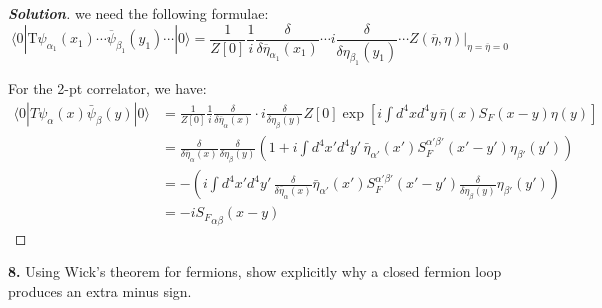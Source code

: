 \documentclass[11pt]{article}
\newenvironment{solution}[1][]{\begin{proof}[\textbf{Solution}]}{\end{proof}}
\begin{document}
\begin{solution}[12.7]
we need the following formulae:
\[
\langle0|\mathrm{T}\psi_{\alpha_1}(x_1)\cdots\overline{\psi}_{\beta_1}(y_1)\cdots|0\rangle=\frac{1}{Z[0]}\frac{1}{i}\left.\frac{\delta}{\delta\overline{\eta}_{\alpha_1}(x_1)}\right.\cdots i\left.\frac{\delta}{\delta\eta_{\beta_1}(y_1)}\right.\cdots\left.Z(\overline{\eta},\eta)\right|_{\eta=\overline{\eta}=0}
\]

For the 2-pt correlator, we have:
\[
\begin{aligned}
\langle0|T\psi_\alpha(x)\bar{\psi}_\beta(y)|0\rangle&=\frac{1}{Z[0]}\frac 1i\frac{\delta}{\delta\overline{\eta}_{\alpha}(x)}\cdot i\frac{\delta}{\delta{\eta}_{\beta}(y)} Z[0] \exp\left[i\int d^4xd^4y\,\overline{\eta}(x)S_F(x-y)\eta(y)\right]\\
&=\frac{\delta}{\delta\overline{\eta}_{\alpha}(x)}\frac{\delta}{\delta{\eta}_{\beta}(y)} \left(1+i\int d^4x'd^4y'\,\bar{\eta}_{\alpha'}(x') S_F^{\alpha'\beta'}(x'-y')\eta_{\beta'}(y')\right)\\
&=- \left(i\int d^4x'd^4y'\,\frac{\delta}{\delta\overline{\eta}_{\alpha}(x)}\bar{\eta}_{\alpha'}(x') S_F^{\alpha'\beta'}(x'-y')\frac{\delta}{\delta{\eta}_{\beta}(y)}\eta_{\beta'}(y')\right)\\
&=-i{S_F}_{\alpha\beta}(x-y)
\end{aligned}
\]
\end{solution}
\begin{tcolorbox}[problem]
\textbf{8.} Using Wick's theorem for fermions, show explicitly why a closed fermion loop produces an extra minus sign.
\end{tcolorbox}
\end{document}
